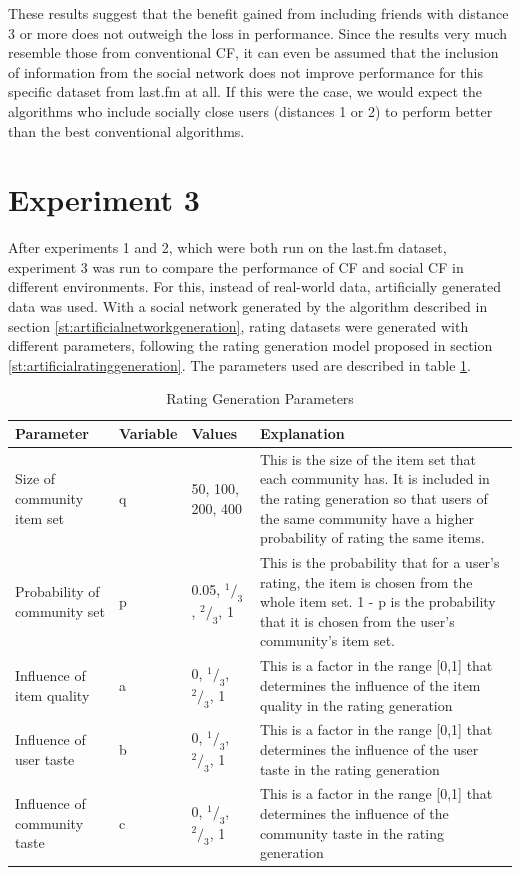 These results suggest that the benefit gained from including friends with distance 3 or more does not outweigh the loss in performance. Since the results very much resemble those from conventional CF, it can even be assumed that the inclusion of information from the social network does not improve performance for this specific dataset from last.fm at all. If this were the case, we would expect the algorithms who include socially close users (distances 1 or 2) to perform better than the best conventional algorithms.
\section{Experiment 3}
\label{st:experiment3} After experiments 1 and 2, which were both run on the last.fm dataset, experiment 3 was run to compare the performance of CF and social CF in different environments. For this, instead of real-world data, artificially generated data was used. With a social network generated by the algorithm described in section \ref{st:artificialnetworkgeneration}, rating datasets were generated with different parameters, following the rating generation model proposed in section \ref{st:artificialratinggeneration}. The parameters used are described in table \ref{t:ratinggenerationparameters}.

\begin{table}[h!]
	\begin{center}
    	\begin{tabular}{ | p{2.5cm} | l | l | p{5cm} |}
   	 \hline
    	Parameter & Variable & Values & Explanation \\ \hline
    	Size of community item set & q & 50, 100, 200, 400 & This is the size of the item set that each community has. It is included in the rating generation so that users of the same community have a higher probability of rating the same items.  \\ \hline
    	Probability of community set & p & 0.05, $^1 / _3$, $^2 / _3$, 1 & This is the probability that for a user's rating, the item is chosen from the whole item set. 1 - p is the probability that it is chosen from the user's community's item set. \\ \hline
    	Influence of item quality & a & 0, $^1 / _3$, $^2 / _3$, 1 & This is a factor in the range [0,1] that determines the influence of the item quality in the rating generation \\ \hline
    	Influence of user taste & b & 0, $^1 / _3$, $^2 / _3$, 1 & This is a factor in the range [0,1] that determines the influence of the user taste in the rating generation \\ \hline
    	Influence of community taste & c & 0, $^1 / _3$, $^2 / _3$, 1 & This is a factor in the range [0,1] that determines the influence of the community taste in the rating generation \\ \hline
    	\end{tabular}
    	\caption{Rating Generation Parameters}
    	\label{t:ratinggenerationparameters}
    	\end{center}
\end{table}

